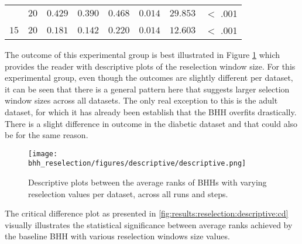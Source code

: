 \begin{table}[htbp]
{\begin{tabular}{lrrrrrrr}
			$ $                  & $20$                 & $0.429$              & $0.390$                                         & $0.468$              & $0.014$              & $29.853$             & $<$ .001    \\
			$15$                 & $20$                 & $0.181$              & $0.142$                                         & $0.220$              & $0.014$              & $12.603$             & $<$ .001    \\
			\bottomrule
		\end{tabular}
	}
\end{table}

The outcome of this experimental group is best illustrated in Figure \ref{fig:results:reselection:descriptive:descriptive} which provides the reader with descriptive plots of the reselection window size. For this experimental group, even though the outcomes are slightly different per dataset, it can be seen that there is a general pattern here that suggests larger selection window sizes across all datasets. The only real exception to this is the adult dataset, for which it has already been establish that the \Ac{BHH} overfits drastically. There is a slight difference in outcome in the diabetic dataset and that could also be for the same reason.

\begin{figure}[htbp]
	\centering
	\texttt{[image: bhh\_reselection/figures/descriptive/descriptive.png]}
	\caption{Descriptive plots between the average ranks of \Acsp{BHH} with varying reselection values per dataset, across all runs and steps.}
	\label{fig:results:reselection:descriptive:descriptive}
\end{figure}

The critical difference plot as presented in \ref{fig:results:reselection:descriptive:cd} visually illustrates the statistical significance between average ranks achieved by the baseline \Ac{BHH} with various reselection windows size values.

